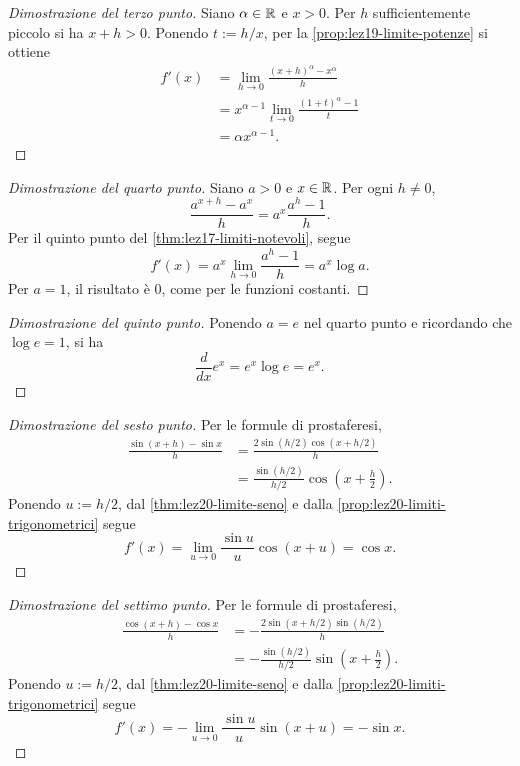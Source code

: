 \begin{proof}[Dimostrazione del terzo punto]
Siano \(\alpha\in\mathbb{R}\) e \(x>0\). Per \(h\)
sufficientemente piccolo si ha \(x+h>0\). Ponendo
\(t:=h/x\), per la
\cref{prop:lez19-limite-potenze} si ottiene
\[
\begin{aligned}
  f'(x)
  &=\lim_{h\to0}\frac{(x+h)^\alpha-x^\alpha}{h}\\
  &=x^{\alpha-1}
    \lim_{t\to0}\frac{(1+t)^\alpha-1}{t}\\
  &=\alpha x^{\alpha-1}.
\end{aligned}
\]
\end{proof}

\begin{proof}[Dimostrazione del quarto punto]
Siano \(a>0\) e \(x\in\mathbb{R}\). Per ogni \(h\ne0\),
\[
  \frac{a^{x+h}-a^x}{h}
  =a^x\frac{a^h-1}{h}.
\]
Per il quinto punto del
\cref{thm:lez17-limiti-notevoli}, segue
\[
  f'(x)=a^x\lim_{h\to0}\frac{a^h-1}{h}
  =a^x\log a.
\]
Per \(a=1\), il risultato è \(0\), come per
le funzioni costanti.
\end{proof}

\begin{proof}[Dimostrazione del quinto punto]
Ponendo \(a=e\) nel quarto punto e ricordando che
\(\log e=1\), si ha
\[
  \frac{d}{dx}e^x=e^x\log e=e^x.
\]
\end{proof}

\begin{proof}[Dimostrazione del sesto punto]
Per le formule di prostaferesi,
\[
\begin{aligned}
  \frac{\sin(x+h)-\sin x}{h}
  &=\frac{2\sin(h/2)\cos(x+h/2)}{h}\\
  &=\frac{\sin(h/2)}{h/2}\cos\left(x+\frac h2\right).
\end{aligned}
\]
Ponendo \(u:=h/2\), dal
\cref{thm:lez20-limite-seno} e dalla
\cref{prop:lez20-limiti-trigonometrici} segue
\[
  f'(x)=\lim_{u\to0}\frac{\sin u}{u}
    \cos(x+u)=\cos x.
\]
\end{proof}

\begin{proof}[Dimostrazione del settimo punto]
Per le formule di prostaferesi,
\[
\begin{aligned}
  \frac{\cos(x+h)-\cos x}{h}
  &=-\frac{2\sin(x+h/2)\sin(h/2)}{h}\\
  &=-\frac{\sin(h/2)}{h/2}\sin\left(x+\frac h2\right).
\end{aligned}
\]
Ponendo \(u:=h/2\), dal
\cref{thm:lez20-limite-seno} e dalla
\cref{prop:lez20-limiti-trigonometrici} segue
\[
  f'(x)=-\lim_{u\to0}\frac{\sin u}{u}
    \sin(x+u)=-\sin x.
\]
\end{proof}

